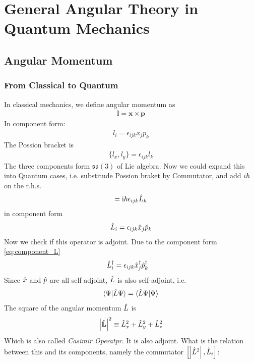 \chapter{General Angular Theory in Quantum Mechanics}

\section{Angular Momentum}

\subsection{From Classical to Quantum}
In classical mechanics, we define angular momentum as 
\begin{eqnarray}
    \mathbf{l} = \mathbf{x} \times \mathbf{p} 
\end{eqnarray}
In component form: 
\begin{eqnarray}
    l_i = \epsilon_{ijk}x_j p_k
\end{eqnarray}
The Possion bracket is 
\begin{eqnarray}
    \{ l_x,l_y \} = \epsilon_{ijk} l_k
\end{eqnarray}
The three components form $\mathfrak{so}(3)$ of Lie algebra. Now we could expand this into Quantum cases, i.e. substitude Possion braket by Commutator, and add $i \hbar$ on the r.h.s.
\begin{eqnarray}
    [ \oL_i,\oL_j ]= \ii \hbar \epsilon_{ijk} \oL_k \label{com_rel_of_L}
\end{eqnarray}
in component form
\begin{eqnarray}
    \hat{L}_i = \epsilon_{ijk} \hat{x}_j \hat{p}_k \label{eq:component_L}
\end{eqnarray}
Now we check if this operator is adjoint. Due to the component form \cref{eq:component_L}
\begin{align*}
    \hat{L}_i^ \dag &= \epsilon_{ijk} \hat{x}_j^\dag \hat{p}_k^\dag 
\end{align*}
Since $\hat{x}$ and $\hat{p}$ are all self-adjoint, $\hat{L}$ is also self-adjoint, i.e.
\begin{eqnarray}
    \braket{\Psi|\hat{L}\Psi} = \braket{\hat{L} \Psi|\Psi} 
\end{eqnarray}
The square of the angular momentum $\hat{L}$ is 
\begin{eqnarray}
    \left| \hat{\mathbf{L}} \right|^2 \equiv \hat{L}_x ^2+ \hat{L}_y^2 +\hat{L}_z^2 \label{dfn:lsquare}
\end{eqnarray}
Which is also called \textit{Casimir Operatpr}. It is also adjoint. What is the relation between this and its components, namely the commutator $\left[ \left| \hat{L}^2 \right|,\hat{L}_i \right]$:
